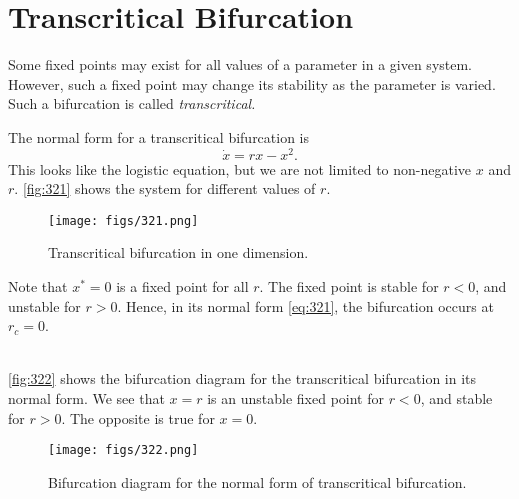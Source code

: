 \documentclass[oneside]{book}
\begin{document}
\section{Transcritical Bifurcation}
Some fixed points may exist for all values of a parameter in a given system. However, such a fixed point may change its stability as the parameter is varied. Such a bifurcation is called \textit{transcritical.}
\par
The normal form for a transcritical bifurcation is
\begin{equation} \label{eq:321}
	\dot{x} = rx - x^2.
\end{equation}
This looks like the logistic equation, but we are not limited to non-negative $ x $ and $ r $. \autoref{fig:321} shows the system for different values of $ r. $
\begin{figure}[h]
	\centering
	\texttt{[image: figs/321.png]}
	\caption{Transcritical bifurcation in one dimension.}
	\label{fig:321}
\end{figure}
\par
Note that $ x^* = 0 $ is a fixed point for all $ r $. The fixed point is stable for $ r < 0 $, and unstable for $ r > 0 $. Hence, in its normal form \eqref{eq:321}, the bifurcation occurs at $ r_c = 0 $.
\\\\
\par
\autoref{fig:322} shows the bifurcation diagram for the transcritical bifurcation in its normal form. We see that $ x = r $ is an unstable fixed point for $ r < 0 $, and stable for $ r > 0 $. The opposite is true for $ x = 0 $.
\begin{figure}[h]
	\centering
	\texttt{[image: figs/322.png]}
	\caption{Bifurcation diagram for the normal form of transcritical bifurcation.}
	\label{fig:322}
\end{figure}
\end{document}
